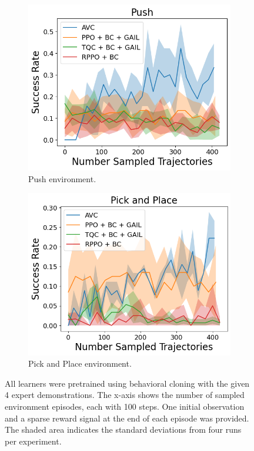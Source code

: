 \begin{figure}[htbp]
\begin{subfigure}[b]{0.45\textwidth}
    \includegraphics[width=\textwidth]{images/4_400/Push.png}
    \caption{Push environment.}
  \end{subfigure}
  \hfill
  \begin{subfigure}[b]{0.45\textwidth}
    \includegraphics[width=\textwidth]{images/4_400/Pick and Place.png}
    \caption{Pick and Place environment.}
  \end{subfigure}
  \caption{All learners were pretrained using behavioral cloning with the given 4 expert demonstrations. 
  The x-axis shows the number of sampled environment episodes, each with 100 steps.  One initial observation and a sparse reward signal at the end of each episode was provided. 
  The shaded area indicates the standard deviations from four runs per experiment.}
\end{figure}


